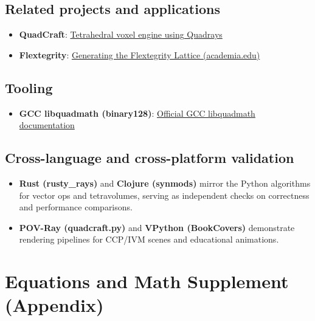 \documentclass[
  10pt,
]{article}
\providecommand{\tightlist}{%
  \setlength{\itemsep}{0pt}\setlength{\parskip}{0pt}}
\begin{document}
\hypertarget{related-projects-and-applications}{%
\subsection{Related projects and
applications}\label{related-projects-and-applications}}

\begin{itemize}
\tightlist
\item
  \textbf{QuadCraft}:
  \href{https://github.com/docxology/quadcraft/}{Tetrahedral voxel
  engine using Quadrays}
\item
  \textbf{Flextegrity}:
  \href{https://www.academia.edu/44531954/Generating_the_Flextegrity_Lattice}{Generating
  the Flextegrity Lattice (academia.edu)}
\end{itemize}

\hypertarget{tooling}{%
\subsection{Tooling}\label{tooling}}

\begin{itemize}
\tightlist
\item
  \textbf{GCC libquadmath (binary128)}:
  \href{https://gcc.gnu.org/onlinedocs/libquadmath/index.html}{Official
  GCC libquadmath documentation}
\end{itemize}

\hypertarget{cross-language-and-cross-platform-validation}{%
\subsection{Cross-language and cross-platform
validation}\label{cross-language-and-cross-platform-validation}}

\begin{itemize}
\tightlist
\item
  \textbf{Rust (rusty\_rays)} and \textbf{Clojure (synmods)} mirror the
  Python algorithms for vector ops and tetravolumes, serving as
  independent checks on correctness and performance comparisons.
\item
  \textbf{POV-Ray (quadcraft.py)} and \textbf{VPython (BookCovers)}
  demonstrate rendering pipelines for CCP/IVM scenes and educational
  animations. 
\end{itemize}

\hypertarget{equations-and-math-supplement-appendix}{%
\section{Equations and Math Supplement
(Appendix)}\label{equations-and-math-supplement-appendix}}
\end{document}
